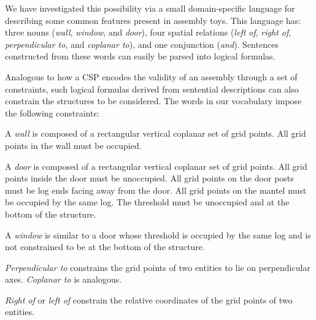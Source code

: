 We have investigated this possibility via a small domain-specific language for
describing some common features present in assembly toys.
%
This language has: three nouns (\emph{wall}, \emph{window}, and \emph{door}),
four spatial relations (\emph{left of}, \emph{right of}, \emph{perpendicular
  to}, and \emph{coplanar to}), and one conjunction (\emph{and}).
%
Sentences constructed from these words can easily be parsed into logical
formulas.

Analogous to how a CSP encodes the validity of an assembly through a set of
constraints, such logical formulas derived from sentential descriptions can also
constrain the structures to be considered.
%
The words in our vocabulary impose the following constraints:
%
\vspace*{0.9ex}
\begin{compactenum}
\item A \emph{wall} is composed of a rectangular vertical coplanar set of grid
  points.
  All grid points in the wall must be occupied.
\item A \emph{door} is composed of a rectangular vertical coplanar set of grid
  points.
  All grid points inside the door must be unoccupied.
  All grid points on the door posts must be log ends facing away from the door.
  All grid points on the mantel must be occupied by the same log.
  The threshold must be unoccupied and at the bottom of the structure.
\item A \emph{window} is similar to a door whose threshold is occupied by the
  same log and is not constrained to be at the bottom of the structure.
\item \emph{Perpendicular to} constrains the grid points of two
  entities to lie on perpendicular axes.
  \emph{Coplanar to} is analogous.
\item \emph{Right of} or \emph{left of} constrain the relative coordinates of
  the grid points of two entities.
\end{compactenum}
\vspace*{0.9ex}


